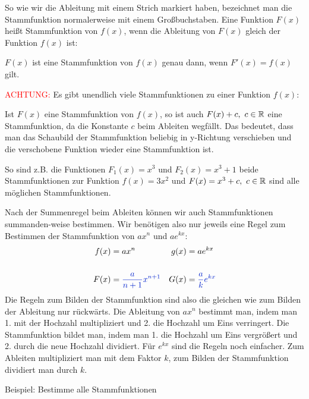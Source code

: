 So wie wir die Ableitung mit einem Strich markiert haben, bezeichnet man die Stammfunktion normalerweise mit einem Großbuchstaben. Eine Funktion \(F(x)\) heißt Stammfunktion von \(f(x)\), wenn die Ableitung von \(F(x)\) gleich der Funktion \(f(x)\) ist:
\begin{tcolorbox}[height=3cm,valign=center]
	\textcolor{loestc}{\(F(x)\) ist eine Stammfunktion von \(f(x)\) genau dann, wenn \(F'(x)=f(x)\) gilt.}
\end{tcolorbox}
\textcolor{red}{ACHTUNG:} Es gibt unendlich viele Stammfunktionen zu einer Funktion \(f(x)\):

\textcolor{loes}{Ist \(F(x)\) eine Stammfunktion von \(f(x)\), so ist auch \(F(x)+c,\ c\in\mathbb{R}\) eine Stammfunktion, da die Konstante \(c\) beim Ableiten wegfällt. Das bedeutet, dass man das Schaubild der Stammfunktion beliebig in y-Richtung verschieben und die verschobene Funktion wieder eine Stammfunktion ist.}

\bigskip

So sind z.B. die Funktionen \(F_1(x)=x^3\) und \(F_2(x)=x^3+1\) beide Stammfunktionen zur Funktion \(f(x)=3x^2\) und \(F(x)=x^3+c,\ c\in\mathbb{R}\) sind alle möglichen Stammfunktionen.

Nach der Summenregel beim Ableiten können wir auch Stammfunktionen summanden-weise bestimmen. Wir benötigen also nur jeweils eine Regel zum Bestimmen der Stammfunktion von \(ax^n\) und \(ae^{kx}\):
\begin{align*}
	f(x)&=ax^n & g(x)&=ae^{kx}\\
	 \\
	F(x)&=\textcolor{loes}{\frac{a}{n+1}x^{n+1}} &	G(x)&=\textcolor{loes}{\frac{a}{k}e^{kx}}
\end{align*}
Die Regeln zum Bilden der Stammfunktion sind also die gleichen wie zum Bilden der Ableitung nur rückwärts. Die Ableitung von \(ax^n\) bestimmt man, indem man 1. mit der Hochzahl multipliziert und 2. die Hochzahl um Eins verringert. Die Stammfunktion bildet man, indem man 1. die Hochzahl um Eins vergrößert und 2. durch die neue Hochzahl dividiert. Für \(e^{kx}\) sind die Regeln noch einfacher. Zum Ableiten multipliziert man mit dem Faktor \(k\), zum Bilden der Stammfunktion dividiert man durch \(k\).

Beispiel: Bestimme alle Stammfunktionen

